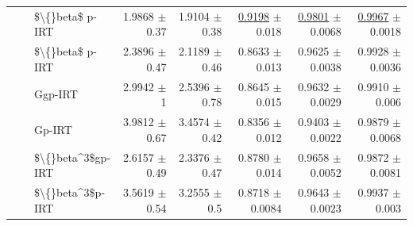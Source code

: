 \begin{longtable}{llp{}rrrrr}
 &  & \$\textbackslash\{\}beta\$ p-IRT & 1.9868 {\scriptsize $\pm$ 0.37} & 1.9104 {\scriptsize $\pm$ 0.38} & \underline{0.9198} {\scriptsize $\pm$ 0.018} & \underline{0.9801} {\scriptsize $\pm$ 0.0068} & \underline{0.9967} {\scriptsize $\pm$ 0.0018} \\
 &  & \$\textbackslash\{\}beta\$ p-IRT & 2.3896 {\scriptsize $\pm$ 0.47} & 2.1189 {\scriptsize $\pm$ 0.46} & 0.8633 {\scriptsize $\pm$ 0.013} & 0.9625 {\scriptsize $\pm$ 0.0038} & 0.9928 {\scriptsize $\pm$ 0.0036} \\
 &  & Ggp-IRT & 2.9942 {\scriptsize $\pm$ 1} & 2.5396 {\scriptsize $\pm$ 0.78} & 0.8645 {\scriptsize $\pm$ 0.015} & 0.9632 {\scriptsize $\pm$ 0.0029} & 0.9910 {\scriptsize $\pm$ 0.006} \\
 &  & Gp-IRT & 3.9812 {\scriptsize $\pm$ 0.67} & 3.4574 {\scriptsize $\pm$ 0.42} & 0.8356 {\scriptsize $\pm$ 0.012} & 0.9403 {\scriptsize $\pm$ 0.0022} & 0.9879 {\scriptsize $\pm$ 0.0068} \\
 &  & \$\textbackslash\{\}beta\textasciicircum{}3\$gp-IRT & 2.6157 {\scriptsize $\pm$ 0.49} & 2.3376 {\scriptsize $\pm$ 0.47} & 0.8780 {\scriptsize $\pm$ 0.014} & 0.9658 {\scriptsize $\pm$ 0.0052} & 0.9872 {\scriptsize $\pm$ 0.0081} \\
 &  & \$\textbackslash\{\}beta\textasciicircum{}3\$p-IRT & 3.5619 {\scriptsize $\pm$ 0.54} & 3.2555 {\scriptsize $\pm$ 0.5} & 0.8718 {\scriptsize $\pm$ 0.0084} & 0.9643 {\scriptsize $\pm$ 0.0023} & 0.9937 {\scriptsize $\pm$ 0.003} \\
\end{longtable}